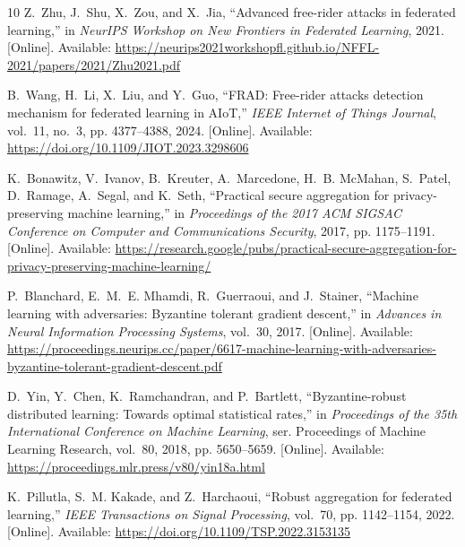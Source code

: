 \documentclass[journal]{IEEEtran}
\begin{document}
\begin{thebibliography}{10}
\BIBentryALTinterwordspacing
Z.~Zhu, J.~Shu, X.~Zou, and X.~Jia, ``Advanced free-rider attacks in federated
  learning,'' in \emph{NeurIPS Workshop on New Frontiers in Federated
  Learning}, 2021. [Online]. Available:
  \url{https://neurips2021workshopfl.github.io/NFFL-2021/papers/2021/Zhu2021.pdf}
\BIBentrySTDinterwordspacing

\BIBentryALTinterwordspacing
B.~Wang, H.~Li, X.~Liu, and Y.~Guo, ``{FRAD}: Free-rider attacks detection
  mechanism for federated learning in {AIoT},'' \emph{IEEE Internet of Things
  Journal}, vol.~11, no.~3, pp. 4377--4388, 2024. [Online]. Available:
  \url{https://doi.org/10.1109/JIOT.2023.3298606}
\BIBentrySTDinterwordspacing

\BIBentryALTinterwordspacing
K.~Bonawitz, V.~Ivanov, B.~Kreuter, A.~Marcedone, H.~B. McMahan, S.~Patel,
  D.~Ramage, A.~Segal, and K.~Seth, ``Practical secure aggregation for
  privacy-preserving machine learning,'' in \emph{Proceedings of the 2017 ACM
  SIGSAC Conference on Computer and Communications Security}, 2017, pp.
  1175--1191. [Online]. Available:
  \url{https://research.google/pubs/practical-secure-aggregation-for-privacy-preserving-machine-learning/}
\BIBentrySTDinterwordspacing

\BIBentryALTinterwordspacing
P.~Blanchard, E.~M.~E. Mhamdi, R.~Guerraoui, and J.~Stainer, ``Machine learning
  with adversaries: Byzantine tolerant gradient descent,'' in \emph{Advances in
  Neural Information Processing Systems}, vol.~30, 2017. [Online]. Available:
  \url{https://proceedings.neurips.cc/paper/6617-machine-learning-with-adversaries-byzantine-tolerant-gradient-descent.pdf}
\BIBentrySTDinterwordspacing

\BIBentryALTinterwordspacing
D.~Yin, Y.~Chen, K.~Ramchandran, and P.~Bartlett, ``Byzantine-robust
  distributed learning: Towards optimal statistical rates,'' in
  \emph{Proceedings of the 35th International Conference on Machine Learning},
  ser. Proceedings of Machine Learning Research, vol.~80, 2018, pp. 5650--5659.
  [Online]. Available: \url{https://proceedings.mlr.press/v80/yin18a.html}
\BIBentrySTDinterwordspacing

\BIBentryALTinterwordspacing
K.~Pillutla, S.~M. Kakade, and Z.~Harchaoui, ``Robust aggregation for federated
  learning,'' \emph{IEEE Transactions on Signal Processing}, vol.~70, pp.
  1142--1154, 2022. [Online]. Available:
  \url{https://doi.org/10.1109/TSP.2022.3153135}
\BIBentrySTDinterwordspacing


\end{thebibliography}
\end{document}
